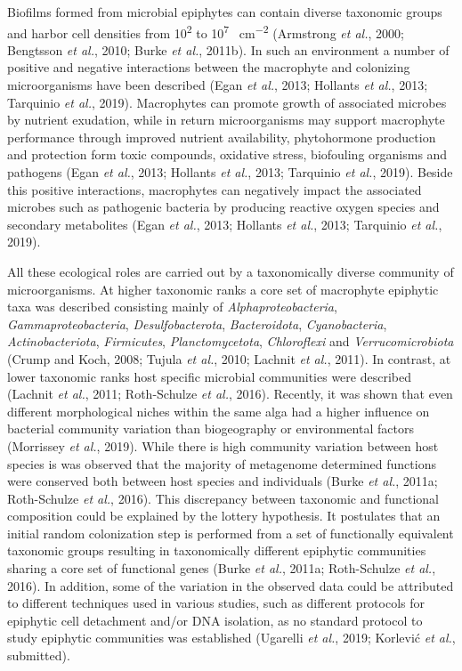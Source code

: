 \documentclass[12pt,]{article}
\begin{document}
Biofilms formed from microbial epiphytes can contain diverse taxonomic
groups and harbor cell densities from 10\textsuperscript{2} to
10\textsuperscript{7} \si{\cells\per\cm\squared} (Armstrong \emph{et
al.}, 2000; Bengtsson \emph{et al.}, 2010; Burke \emph{et al.}, 2011b).
In such an environment a number of positive and negative interactions
between the macrophyte and colonizing microorganisms have been described
(Egan \emph{et al.}, 2013; Hollants \emph{et al.}, 2013; Tarquinio
\emph{et al.}, 2019). Macrophytes can promote growth of associated
microbes by nutrient exudation, while in return microorganisms may
support macrophyte performance through improved nutrient availability,
phytohormone production and protection form toxic compounds, oxidative
stress, biofouling organisms and pathogens (Egan \emph{et al.}, 2013;
Hollants \emph{et al.}, 2013; Tarquinio \emph{et al.}, 2019). Beside
this positive interactions, macrophytes can negatively impact the
associated microbes such as pathogenic bacteria by producing reactive
oxygen species and secondary metabolites (Egan \emph{et al.}, 2013;
Hollants \emph{et al.}, 2013; Tarquinio \emph{et al.}, 2019).

All these ecological roles are carried out by a taxonomically diverse
community of microorganisms. At higher taxonomic ranks a core set of
macrophyte epiphytic taxa was described consisting mainly of
\emph{Alphaproteobacteria}, \emph{Gammaproteobacteria},
\emph{Desulfobacterota}, \emph{Bacteroidota}, \emph{Cyanobacteria},
\emph{Actinobacteriota}, \emph{Firmicutes}, \emph{Planctomycetota},
\emph{Chloroflexi} and \emph{Verrucomicrobiota} (Crump and Koch, 2008;
Tujula \emph{et al.}, 2010; Lachnit \emph{et al.}, 2011). In contrast,
at lower taxonomic ranks host specific microbial communities were
described (Lachnit \emph{et al.}, 2011; Roth-Schulze \emph{et al.},
2016). Recently, it was shown that even different morphological niches
within the same alga had a higher influence on bacterial community
variation than biogeography or environmental factors (Morrissey \emph{et
al.}, 2019). While there is high community variation between host
species is was observed that the majority of metagenome determined
functions were conserved both between host species and individuals
(Burke \emph{et al.}, 2011a; Roth-Schulze \emph{et al.}, 2016). This
discrepancy between taxonomic and functional composition could be
explained by the lottery hypothesis. It postulates that an initial
random colonization step is performed from a set of functionally
equivalent taxonomic groups resulting in taxonomically different
epiphytic communities sharing a core set of functional genes (Burke
\emph{et al.}, 2011a; Roth-Schulze \emph{et al.}, 2016). In addition,
some of the variation in the observed data could be attributed to
different techniques used in various studies, such as different
protocols for epiphytic cell detachment and/or DNA isolation, as no
standard protocol to study epiphytic communities was established
(Ugarelli \emph{et al.}, 2019; Korlević \emph{et al.}, submitted).
\end{document}
